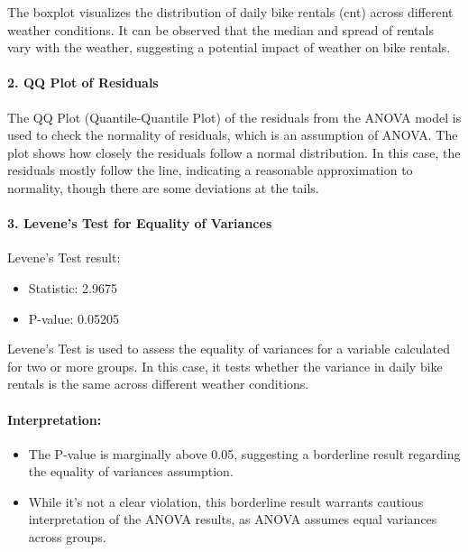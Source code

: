 \documentclass[
]{article}
\begin{document}
The boxplot visualizes the distribution of daily bike rentals (cnt)
across different weather conditions. It can be observed that the median
and spread of rentals vary with the weather, suggesting a potential
impact of weather on bike rentals.

\paragraph{2. QQ Plot of Residuals}\label{qq-plot-of-residuals}

The QQ Plot (Quantile-Quantile Plot) of the residuals from the ANOVA
model is used to check the normality of residuals, which is an
assumption of ANOVA. The plot shows how closely the residuals follow a
normal distribution. In this case, the residuals mostly follow the line,
indicating a reasonable approximation to normality, though there are
some deviations at the tails.

\paragraph{3. Levene's Test for Equality of
Variances}\label{levenes-test-for-equality-of-variances}

Levene's Test result:

\begin{itemize}
\item
  Statistic: 2.9675
\item
  P-value: 0.05205
\end{itemize}

Levene's Test is used to assess the equality of variances for a variable
calculated for two or more groups. In this case, it tests whether the
variance in daily bike rentals is the same across different weather
conditions.

\paragraph{Interpretation:}\label{interpretation-1}

\begin{itemize}
\item
  The P-value is marginally above 0.05, suggesting a borderline result
  regarding the equality of variances assumption.
\item
  While it's not a clear violation, this borderline result warrants
  cautious interpretation of the ANOVA results, as ANOVA assumes equal
  variances across groups.
\end{itemize}
\end{document}
